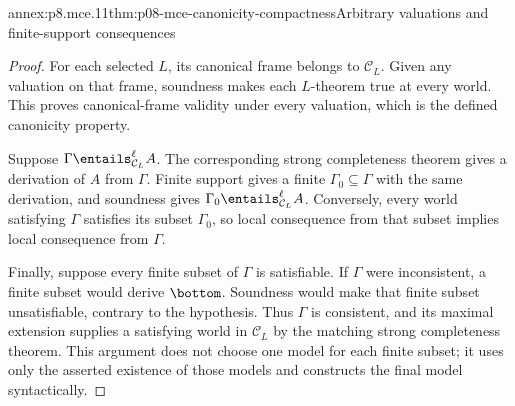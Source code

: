 \begin{annexitem}{annex:p8.mce.11}{thm:p08-mce-canonicity-compactness}{Arbitrary valuations and finite-support consequences}
\begin{proof}
For each selected \(L\), its canonical frame belongs to
\(\mathcal C_L\). Given any valuation on that frame, soundness makes
each \(L\)-theorem true at every world. This proves canonical-frame
validity under every valuation, which is the defined canonicity property.

Suppose \(\Gamma\entails^{\ell}_{\mathcal C_L}A\). The corresponding
strong completeness theorem gives a derivation of \(A\) from
\(\Gamma\). Finite support gives a finite
\(\Gamma_0\subseteq\Gamma\) with the same derivation, and soundness
gives \(\Gamma_0\entails^{\ell}_{\mathcal C_L}A\). Conversely,
every world satisfying \(\Gamma\) satisfies its subset \(\Gamma_0\),
so local consequence from that subset implies local consequence from
\(\Gamma\).

Finally, suppose every finite subset of \(\Gamma\) is satisfiable.
If \(\Gamma\) were inconsistent, a finite subset would derive
\(\bottom\). Soundness would make that finite subset unsatisfiable,
contrary to the hypothesis. Thus \(\Gamma\) is consistent, and its
maximal extension supplies a satisfying world in \(\mathcal C_L\) by
the matching strong completeness theorem. This argument does not choose
one model for each finite subset; it uses only the asserted existence of
those models and constructs the final model syntactically.
\end{proof}
\end{annexitem}
